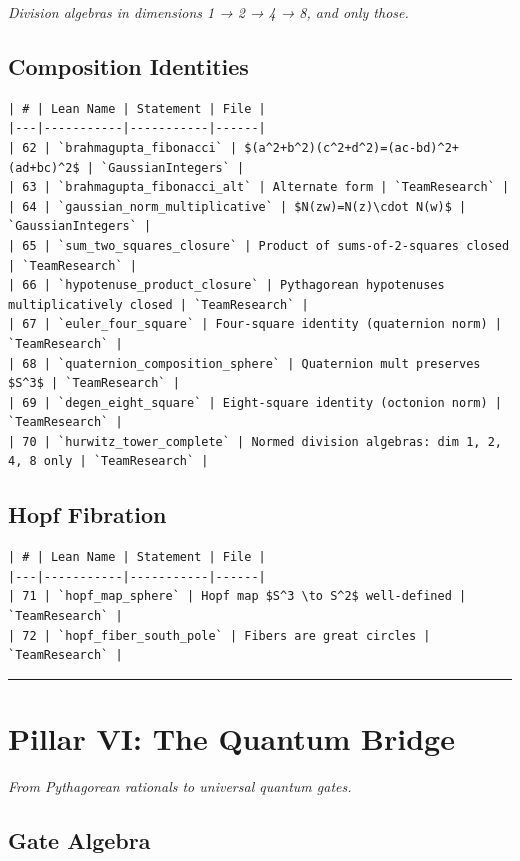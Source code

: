 \documentclass[12pt,a4paper,openany]{book}
\begin{document}
\textit{Division algebras in dimensions 1 → 2 → 4 → 8, and only those.}

\subsection{Composition Identities}

\begin{verbatim}
| # | Lean Name | Statement | File |
|---|-----------|-----------|------|
| 62 | `brahmagupta_fibonacci` | $(a^2+b^2)(c^2+d^2)=(ac-bd)^2+(ad+bc)^2$ | `GaussianIntegers` |
| 63 | `brahmagupta_fibonacci_alt` | Alternate form | `TeamResearch` |
| 64 | `gaussian_norm_multiplicative` | $N(zw)=N(z)\cdot N(w)$ | `GaussianIntegers` |
| 65 | `sum_two_squares_closure` | Product of sums-of-2-squares closed | `TeamResearch` |
| 66 | `hypotenuse_product_closure` | Pythagorean hypotenuses multiplicatively closed | `TeamResearch` |
| 67 | `euler_four_square` | Four-square identity (quaternion norm) | `TeamResearch` |
| 68 | `quaternion_composition_sphere` | Quaternion mult preserves $S^3$ | `TeamResearch` |
| 69 | `degen_eight_square` | Eight-square identity (octonion norm) | `TeamResearch` |
| 70 | `hurwitz_tower_complete` | Normed division algebras: dim 1, 2, 4, 8 only | `TeamResearch` |
\end{verbatim}

\subsection{Hopf Fibration}

\begin{verbatim}
| # | Lean Name | Statement | File |
|---|-----------|-----------|------|
| 71 | `hopf_map_sphere` | Hopf map $S^3 \to S^2$ well-defined | `TeamResearch` |
| 72 | `hopf_fiber_south_pole` | Fibers are great circles | `TeamResearch` |
\end{verbatim}

\bigskip\hrule\bigskip

\section{Pillar VI: The Quantum Bridge}

\textit{From Pythagorean rationals to universal quantum gates.}

\subsection{Gate Algebra}
\end{document}
